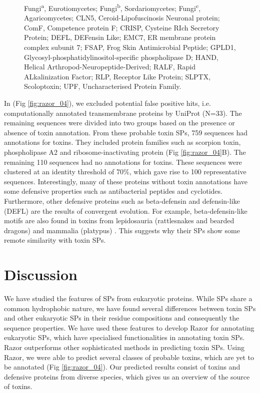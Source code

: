 \begin{figure}
\captionsetup{labelformat=empty}
\caption[]{
 Fungi\textsuperscript{a}, Eurotiomycetes; Fungi\textsuperscript{b}, Sordariomycetes; Fungi\textsuperscript{c}, Agaricomycetes; CLN5, Ceroid-Lipofuscinosis Neuronal protein; ComF, Competence protein F; CRISP, Cysteine RIch Secretory Protein; DEFL, DEFensin Like; EMC7, ER membrane protein complex subunit 7; FSAP, Frog Skin Antimicrobial Peptide; GPLD1, Glycosyl-phosphatidylinositol-specific phospholipase D; HAND, Helical Arthropod-Neuropeptide-Derived; RALF, Rapid ALkalinization Factor; RLP, Receptor Like Protein; SLPTX, Scoloptoxin; UPF, Uncharacterised Protein Family.
}
\end{figure}



In (Fig \ref{fig:razor_04}), we excluded potential false positive hits, i.e. computationally annotated transmembrane proteins by UniProt (N=33). The remaining sequences were divided into two groups based on the presence or absence of toxin annotation. From these probable toxin SPs, 759 sequences had annotations for toxins. They included protein families such as scorpion toxin, phospholipase A2 and ribosome-inactivating protein (Fig \ref{fig:razor_04}B). The remaining 110 sequences had no annotations for toxins. These sequences were clustered at an identity threshold of 70\%, which gave rise to 100 representative sequences. Interestingly, many of these proteins without toxin annotations have some defensive properties such as antibacterial peptides and cyclotides. Furthermore, other defensive proteins such as beta-defensin and defensin-like (DEFL) are the results of convergent evolution. For example, beta-defensin-like motifs are also found in toxins from lepidosauria (rattlesnakes and bearded dragons) and mammalia (platypus) \cite{Fry2009-iu,Fry2010-bs,Whittington2008-vm}. This suggests why their SPs show some remote similarity with toxin SPs.


\section{Discussion}
We have studied the features of SPs from eukaryotic proteins. While SPs share a common hydrophobic nature, we have found several differences between toxin SPs and other eukaryotic SPs in their residue compositions and consequently the sequence properties. We have used these features to develop Razor for annotating eukaryotic SPs, which have specialised functionalities in annotating toxin SPs. Razor outperforms other sophisticated methods in predicting toxin SPs. Using Razor, we were able to predict several classes of probable toxins, which are yet to be annotated (Fig \ref{fig:razor_04}). Our predicted results consist of toxins and defensive proteins from diverse species, which gives us an overview of the source of toxins.


